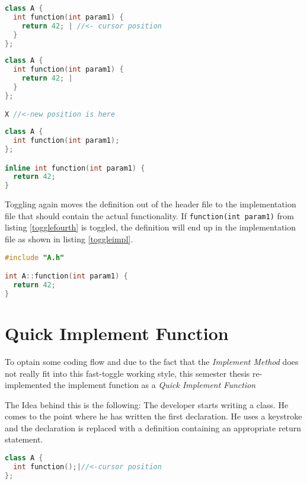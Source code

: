 \begin{lstlisting}[caption={Startposition of toggling},
label={togglefirst}, language=C++]
class A {
  int function(int param1) {
    return 42; | //<- cursor position
  }
};
\end{lstlisting}

\begin{lstlisting}[caption={New position is found},
label={togglethird}, language=C++]
class A {
  int function(int param1) {
    return 42; |
  }
};

X //<-new position is here
\end{lstlisting}

\begin{lstlisting}[caption={Class with declaration and inlined definition},
label={togglefourth}, language=C++]
class A {
  int function(int param1);
};

inline int function(int param1) {
  return 42;
}
\end{lstlisting}

Toggling again moves the definition out of the header file to the 
implementation file that should contain the actual functionality. If
\texttt{function(int param1)} from listing \ref{togglefourth} is toggled,
the definition will end up in the implementation file as shown in listing
\ref{toggleimpl}.

\begin{lstlisting}[caption={defintion in a implementation file},
label={toggleimpl}, language=C++]
#include "A.h"

int A::function(int param1) {
  return 42;
}
\end{lstlisting}

\section*{Quick Implement Function}

To optain some coding flow and due to the fact that the \textit{Implement
Method} does not really fit into this fast-toggle working style, this semester
thesis re-implemented the implement function as a \textit{Quick Implement
Function}

The Idea behind this is the following: The developer starts writing a class.
He comes to the point where he has written the first declaration. He uses a
keystroke and the declaration is replaced with a definition containing an
appropriate return statement.

\begin{lstlisting}[caption={Situation before quick implement},
label={beforeimpl}, language=C++]
class A {
  int function();|//<-cursor position
};
\end{lstlisting}

